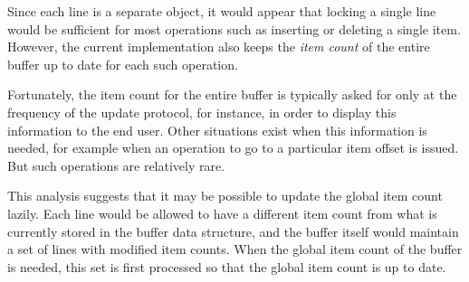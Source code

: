 Since each line is a separate object, it would appear that locking a
single line would be sufficient for most operations such as inserting
or deleting a single item.  However, the current implementation also
keeps the \emph{item count} of the entire buffer up to date for each
such operation.

Fortunately, the item count for the entire buffer is typically asked
for only at the frequency of the update protocol, for instance, in
order to display this information to the end user.  Other situations
exist when this information is needed, for example when an operation
to go to a particular item offset is issued.  But such operations are
relatively rare.

This analysis suggests that it may be possible to update the global
item count lazily.  Each line would be allowed to have a different
item count from what is currently stored in the buffer data structure,
and the buffer itself would maintain a set of lines with modified item
counts.  When the global item count of the buffer is needed, this set
is first processed so that the global item count is up to date.
